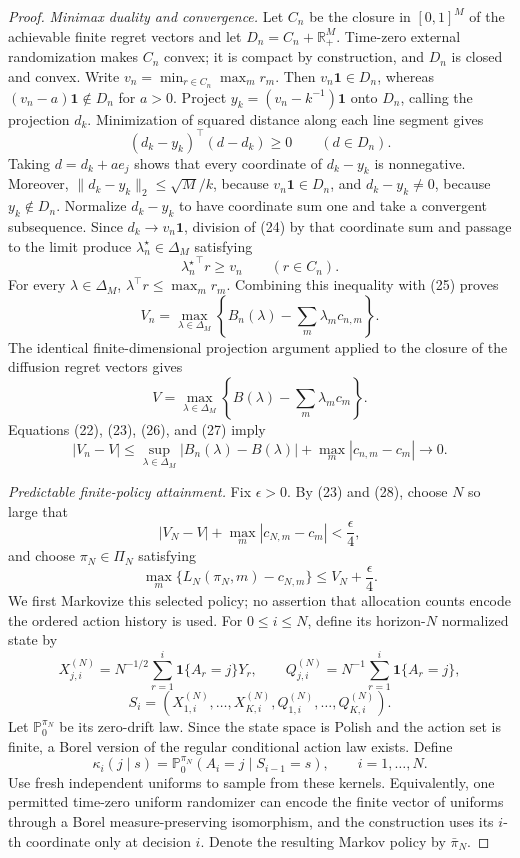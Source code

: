 \documentclass{article}
\begin{document}
\begin{proof}
\emph{Minimax duality and convergence.}  Let \(C_n\) be the closure in \([0,1]^M\) of the achievable finite regret vectors and let \(D_n=C_n+\mathbb R_+^M\).  Time-zero external randomization makes \(C_n\) convex; it is compact by construction, and \(D_n\) is closed and convex.  Write \(v_n=\min_{r\in C_n}\max_mr_m\).  Then \(v_n\mathbf 1\in D_n\), whereas \((v_n-a)\mathbf 1\notin D_n\) for \(a>0\).  Project \(y_k=(v_n-k^{-1})\mathbf 1\) onto \(D_n\), calling the projection \(d_k\).  Minimization of squared distance along each line segment gives
\[
 (d_k-y_k)^\top(d-d_k)\geq0\qquad(d\in D_n).                    \tag{24}
\]
Taking \(d=d_k+ae_j\) shows that every coordinate of \(d_k-y_k\) is nonnegative.  Moreover, \(\|d_k-y_k\|_2\leq\sqrt M/k\), because \(v_n\mathbf1\in D_n\), and \(d_k-y_k\neq0\), because \(y_k\notin D_n\).  Normalize \(d_k-y_k\) to have coordinate sum one and take a convergent subsequence.  Since \(d_k\to v_n\mathbf1\), division of (24) by that coordinate sum and passage to the limit produce \(\lambda_n^\star\in\Delta_M\) satisfying
\[
 {\lambda_n^\star}^{\!\top}r\geq v_n\qquad(r\in C_n).          \tag{25}
\]
For every \(\lambda\in\Delta_M\), \(\lambda^\top r\leq\max_mr_m\).  Combining this inequality with (25) proves
\[
 V_n=\max_{\lambda\in\Delta_M}
 \left\{B_n(\lambda)-\sum_m\lambda_mc_{n,m}\right\}.           \tag{26}
\]
The identical finite-dimensional projection argument applied to the closure of the diffusion regret vectors gives
\[
 V=\max_{\lambda\in\Delta_M}
 \left\{B(\lambda)-\sum_m\lambda_mc_m\right\}.                 \tag{27}
\]
Equations (22), (23), (26), and (27) imply
\[
 |V_n-V|\leq
 \sup_{\lambda\in\Delta_M}|B_n(\lambda)-B(\lambda)|
 +\max_m|c_{n,m}-c_m|\longrightarrow0.                           \tag{28}
\]

\emph{Predictable finite-policy attainment.}  Fix \(\epsilon>0\).  By (23) and (28), choose \(N\) so large that
\[
 |V_N-V|+\max_m|c_{N,m}-c_m|<\frac\epsilon4,                    \tag{29}
\]
and choose \(\pi_N\in\Pi_N\) satisfying
\[
 \max_m\{L_N(\pi_N,m)-c_{N,m}\}\leq V_N+\frac\epsilon4.       \tag{30}
\]
We first Markovize this selected policy; no assertion that allocation counts encode the ordered action history is used.  For \(0\leq i\leq N\), define its horizon-\(N\) normalized state by
\[
 X_{j,i}^{(N)}=N^{-1/2}\sum_{r=1}^i\mathbf 1\{A_r=j\}Y_r,
 \qquad
 Q_{j,i}^{(N)}=N^{-1}\sum_{r=1}^i\mathbf 1\{A_r=j\},
\]
\[
 S_i=(X_{1,i}^{(N)},\ldots,X_{K,i}^{(N)},Q_{1,i}^{(N)},\ldots,Q_{K,i}^{(N)}).
\]
Let \(\mathbb P_0^{\pi_N}\) be its zero-drift law.  Since the state space is Polish and the action set is finite, a Borel version of the regular conditional action law exists.  Define
\[
 \kappa_i(j\mid s)
 =\mathbb P_0^{\pi_N}(A_i=j\mid S_{i-1}=s),
 \qquad i=1,\ldots,N.                                           \tag{31}
\]
Use fresh independent uniforms to sample from these kernels.  Equivalently, one permitted time-zero uniform randomizer can encode the finite vector of uniforms through a Borel measure-preserving isomorphism, and the construction uses its \(i\)-th coordinate only at decision \(i\).  Denote the resulting Markov policy by \(\bar\pi_N\).


\end{proof}
\end{document}
